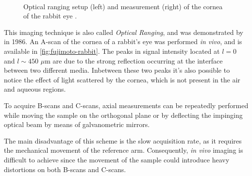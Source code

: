 \begin{figure}[hbt]
	\myfloatalign
	 \quad
	\\
	\caption{ Optical ranging setup (left) and measurement (right) of the cornea of the rabbit eye \cite{Fujimoto1986}. }\label{fig:fujimoto}
\end{figure}

This imaging technique is also called \emph{Optical Ranging}, and was demonstrated by \citeauthor{Fujimoto1986}\cite{Fujimoto1986} in 1986. An A-scan of the cornea of a rabbit's eye was performed \emph{in vivo}, and is available in \autoref{fig:fujimoto-rabbit}. The peaks in signal intensity located at $l = 0$ and $l \sim 450$ $\mu$m are due to the strong reflection occurring at the interface between two different media. Inbetween these two peaks it's also possible to notice the effect of light scattered by the cornea, which is not present in the air and aqueous regions. 


To acquire B-scans and C-scans, axial measurements can be repeatedly performed while moving the sample on the orthogonal plane or by deflecting the impinging optical beam by means of galvanometric mirrors. 

The main disadvantage of this scheme is the slow acquisition rate, as it requires the mechanical movement of the reference arm. Consequently, \emph{in vivo} imaging is difficult to achieve since the movement of the sample could introduce heavy distortions on both B-scans and C-scans. 

